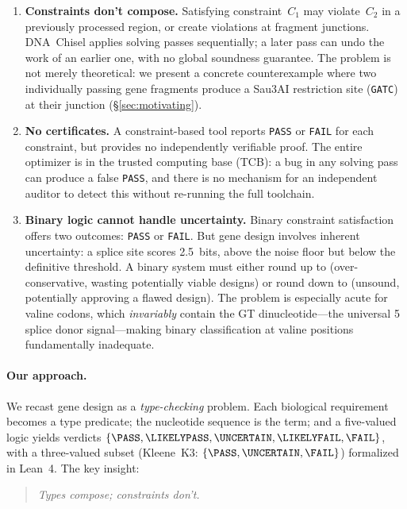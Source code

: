 \begin{enumerate}[leftmargin=*,itemsep=1pt,topsep=2pt]
\item \textbf{Constraints don't compose.}
Satisfying constraint~$C_1$ may violate~$C_2$ in a previously
processed region, or create violations at fragment junctions.
DNA~Chisel applies solving passes sequentially; a later pass can undo
the work of an earlier one, with no global soundness guarantee.
The problem is not merely theoretical: we present a concrete
counterexample where two individually passing gene fragments produce a
Sau3AI restriction site (\texttt{GATC}) at their junction
(\S\ref{sec:motivating}).

\item \textbf{No certificates.}
A constraint-based tool reports \texttt{PASS} or \texttt{FAIL} for
each constraint, but provides no independently verifiable proof.
The entire optimizer is in the trusted computing base (TCB): a bug in
any solving pass can produce a false \texttt{PASS}, and there is no
mechanism for an independent auditor to detect this without re-running
the full toolchain.

\item \textbf{Binary logic cannot handle uncertainty.}
Binary constraint satisfaction offers two outcomes:
\texttt{PASS} or \texttt{FAIL}.
But gene design involves inherent uncertainty: a splice site scores
2.5~bits, above the noise floor but below the definitive threshold.
A binary system must either round up to \FAIL{} (over-conservative,
wasting potentially viable designs) or round down to \PASS{}
(unsound, potentially approving a flawed design).
The problem is especially acute for valine codons, which
\emph{invariably} contain the GT dinucleotide---the universal
5\textquotesingle{} splice donor signal---making binary classification
at valine positions fundamentally inadequate.
\end{enumerate}

\paragraph{Our approach.}
We recast gene design as a \emph{type-checking} problem.
Each biological requirement becomes a type predicate; the nucleotide
sequence is the term; and a five-valued logic yields
verdicts $\{\PASS, \LIKELYPASS, \UNCERTAIN, \LIKELYFAIL, \FAIL\}$,
with a three-valued subset (Kleene~K3: $\{\PASS, \UNCERTAIN, \FAIL\}$)
formalized in Lean~4.
The key insight:

\begin{quote}
\emph{Types compose; constraints don't.}
\end{quote}

